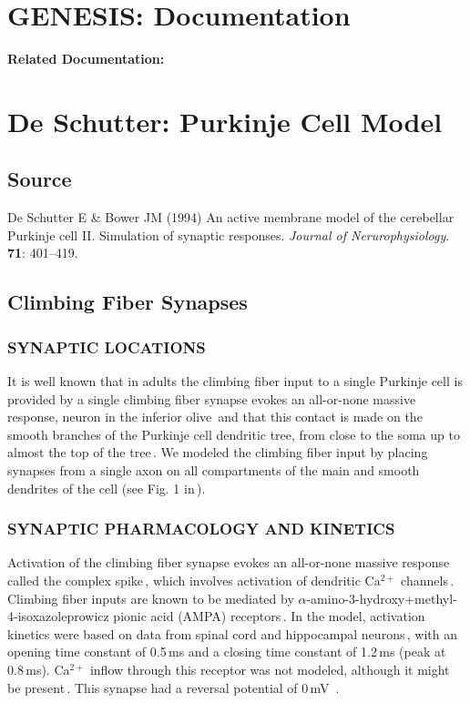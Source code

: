 \documentclass[12pt]{article}
\begin{document}
\section*{GENESIS: Documentation}

{\bf Related Documentation:}

\section*{De Schutter: Purkinje Cell Model}

\subsection*{Source}

De Schutter E \& Bower JM (1994) An active membrane model of the cerebellar Purkinje cell II. Simulation of synaptic responses. {\it Journal of Nerurophysiology}. {\bf 71}: 401--419.

\subsection*{Climbing Fiber Synapses}
\subsubsection*{SYNAPTIC LOCATIONS}
It is well known that in adults the climbing
fiber input to a single Purkinje cell is provided by a single
climbing fiber synapse evokes an all-or-none massive response,
neuron in the inferior olive\,\cite{Ito:1984uq} and that this contact is
made on the smooth branches of the Purkinje cell dendritic tree,
from close to the soma up to almost the top of the tree\,\cite{Palay:1974fk}.
We modeled the climbing fiber input by placing
synapses from a single axon on all compartments of the main
and smooth dendrites of the cell (see Fig. 1 in\,\cite{deschutter94:_purkin_i}).

\subsubsection*{SYNAPTIC PHARMACOLOGY AND KINETICS}
Activation of the climbing fiber synapse evokes an all-or-none massive response
called the complex spike\,\cite{Eccles:1966kx, Llinas:1980vn}, which involves activation of dendritic Ca$^{2+}$ channels\,\cite{Knopfel:1991ys, Konnerth:1992zr, R:1980pi, Miyakawa:1992ly}.
Climbing fiber inputs are known to
be mediated by $\alpha$-amino-3-hydroxy+methyl-4-isoxazoleprowicz
pionic acid (AMPA) receptors\,\cite{Knopfel:1990ve, Llano:1991qf}.
In the model, activation kinetics were based on data from
spinal cord and hippocampal neurons\,\cite{Forsythe:1988bh, Holmes:1963dq, Nelson:1986cr},
with an opening time constant of 0.5\,ms and a closing time constant of 1.2\,ms
(peak at 0.8\,ms). Ca$^{2+}$ inflow through this receptor was not modeled,
although it might be present\,\cite{Brorson:1992nx}. This synapse had a reversal potential of 0\,mV\,\cite{Cull-Candy:1989oq, Mayer:1987kl} .
\end{document}
